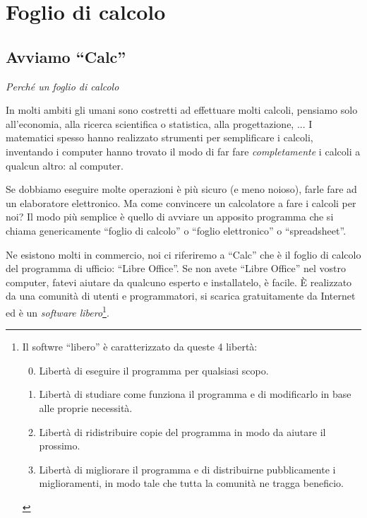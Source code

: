 
\newcommand{\salvare}[1][.5]{
\emph{Questo è un buon momento per salvare il lavoro fatto.}
\vspace{#1em}
}

\newcommand{\sottotitolo}[1]{
\emph{#1}
\vspace{.5em}
}

\chapter{Foglio di calcolo}

\section{Avviamo ``Calc''}

\sottotitolo{Perché un foglio di calcolo}

In molti ambiti gli umani sono costretti ad effettuare molti calcoli,
pensiamo solo all'economia, alla ricerca scientifica o statistica,
alla progettazione, ...
I matematici spesso hanno realizzato strumenti per semplificare i calcoli,
inventando i computer hanno trovato il modo di far fare \emph{completamente} 
i calcoli a qualcun altro: al computer.

Se dobbiamo eseguire molte operazioni è più sicuro (e meno noioso),
farle fare ad un elaboratore elettronico. Ma come convincere un
calcolatore a fare i calcoli per noi? Il modo più semplice è quello di
avviare un apposito programma che si chiama genericamente
``foglio di calcolo'' o ``foglio elettronico'' o ``spreadsheet''.

Ne esistono molti in commercio, noi ci riferiremo a ``Calc'' che è il
foglio di calcolo del programma di ufficio: ``Libre Office''.
Se non avete ``Libre Office'' nel vostro computer, fatevi aiutare da qualcuno
esperto e installatelo, è facile.
È realizzato da una comunità di utenti e programmatori, si scarica 
gratuitamente da Internet ed è un \emph{software libero}\footnote{
Il softwre ``libero'' è caratterizzato da queste 4 libertà:
\begin{enumerate} [nosep]
  \setcounter{enumi}{-1}
\item Libertà di eseguire il programma per qualsiasi scopo. 
\item Libertà di studiare come funziona il programma e di modificarlo in base 
alle proprie necessità.
\item Libertà di ridistribuire copie del programma in modo da aiutare il 
prossimo.
\item Libertà di migliorare il programma e di distribuirne 
pubblicamente i miglioramenti, in modo tale che tutta la comunità ne tragga 
beneficio.
\end{enumerate}
}.

